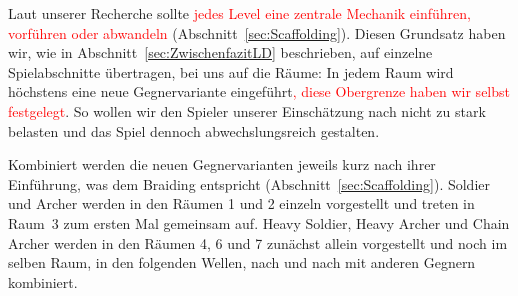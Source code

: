 \documentclass[../Main.tex]{subfiles}
\begin{document}
Laut unserer Recherche sollte \textcolor{red}{jedes Level eine zentrale Mechanik einführen, vorführen oder abwandeln} (Abschnitt~\ref{sec:Scaffolding}). Diesen Grundsatz haben wir, wie in Abschnitt~\ref{sec:ZwischenfazitLD} beschrieben, auf einzelne Spielabschnitte übertragen, bei uns auf die Räume: In jedem Raum wird höchstens eine neue Gegnervariante eingeführt\textcolor{red}{, diese Obergrenze haben wir selbst festgelegt}. So wollen wir den Spieler unserer Einschätzung nach nicht zu stark belasten und das Spiel dennoch abwechslungsreich gestalten.

Kombiniert werden die neuen Gegnervarianten jeweils kurz nach ihrer Einführung, was dem Braiding entspricht (Abschnitt~\ref{sec:Scaffolding}). Soldier und Archer werden in den Räumen 1 und 2 einzeln vorgestellt und treten in Raum~3 zum ersten Mal gemeinsam auf. Heavy Soldier, Heavy Archer und Chain Archer werden in den Räumen 4, 6 und 7 zunächst allein vorgestellt und noch im selben Raum, in den folgenden Wellen, nach und nach mit anderen Gegnern kombiniert.
\end{document}
